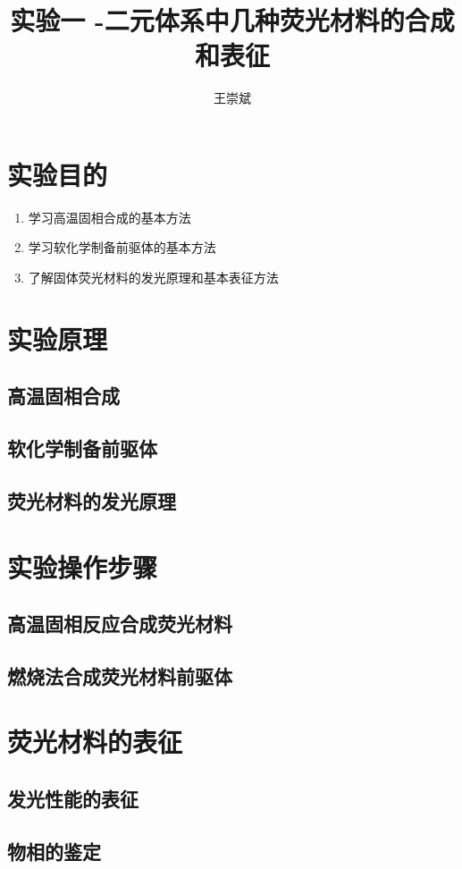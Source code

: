 \documentclass[a4paper,zihao=5,UTF8]{ctexart}
\title{\textbf{实验一 \ce{SrO}-\ce{Al2O3}二元体系中几种荧光材料的合成和表征\cite{inorganic_chemistry_1}}}
\author{王崇斌\;1800011716}
\begin{document}
	\pagestyle{fancy}
	\pagestyle{fancy}
	\chead{}
	\rhead{\today}
	\maketitle
    \thispagestyle{fancy}
	\section{实验目的}
	\begin{enumerate}
		\item 学习高温固相合成的基本方法
		\item 学习软化学制备前驱体的基本方法
		\item 了解固体荧光材料的发光原理和基本表征方法
	\end{enumerate}
	\section{实验原理}
	\subsection{高温固相合成}
	\subsection{软化学制备前驱体}
	\subsection{荧光材料的发光原理}
	\section{实验操作步骤}
	\subsection{高温固相反应合成荧光材料}
	\subsection{燃烧法合成荧光材料前驱体}
	\section{荧光材料的表征}
	\subsection{发光性能的表征}
	\subsection{物相的鉴定}

	
	
	
\end{document}
